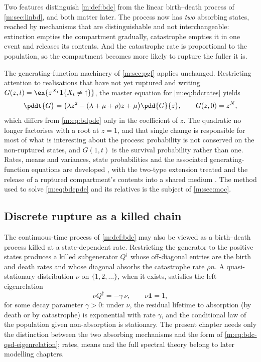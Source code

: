 Two features distinguish \cref{m:def:bdc} from the linear birth--death process of
\cref{m:sec:linbd}, and both matter later. The process now has \emph{two} absorbing
states, reached by mechanisms that are distinguishable and not interchangeable:
extinction empties the compartment gradually, catastrophe empties it in one event
and releases its contents. And the catastrophe rate is proportional to the
population, so the compartment becomes more likely to rupture the fuller it is.

The generating-function machinery of \cref{m:sec:pgf} applies unchanged. Restricting
attention to realisations that have not yet ruptured and writing
$G(z,t) = \ex{z^{X_t}\mathbf 1\{X_t\neq\dagger\}}$, the master equation for
\cref{m:eq:bdcrates} yields
\begin{equation}
\label{m:eq:bdcpde}
\pddt{G} = \bigl(\lambda z^2-(\lambda+\mu+\rho)z+\mu\bigr)\pdd{G}{z},
\qquad G(z,0) = z^{N},
\end{equation}
which differs from \cref{m:eq:bdpde} only in the coefficient of $z$. The quadratic no
longer factorises with a root at $z=1$, and that single change is responsible for
most of what is interesting about the process: probability is not conserved on the
non-ruptured states, and $G(1,t)$ is the survival probability rather than one.
Rates, means and variances, state probabilities and the associated
generating-function equations are developed , with the two-type extension treated
 and the release of a
ruptured compartment's contents into a shared medium
. The method used to solve
\cref{m:eq:bdcpde} and its relatives is the subject of \cref{m:sec:moc}.


\subsection{Discrete rupture as a killed chain}
\label{m:sec:killed-bdc}

The continuous-time process of \cref{m:def:bdc} may also be viewed as a birth--death
process killed at a state-dependent rate. Restricting the generator to the positive
states produces a killed subgenerator $Q^\dagger$ whose off-diagonal entries are the
birth and death rates and whose diagonal absorbs the catastrophe rate $\rho n$. A
quasi-stationary distribution $\nu$ on $\{1,2,\dots\}$, when it exists, satisfies
the left eigenrelation
\begin{equation}
\label{m:eq:bdc-qsd-eigenrelation}
\nu Q^\dagger = -\gamma\,\nu,
\qquad \nu\mathbf 1=1,
\end{equation}
for some decay parameter $\gamma>0$: under $\nu$, the residual lifetime to absorption
(by death or by catastrophe) is exponential with rate $\gamma$, and the conditional
law of the population given non-absorption is stationary. The present chapter needs
only the distinction between the two absorbing mechanisms and the form of
\cref{m:eq:bdc-qsd-eigenrelation}; rates, means and the full spectral theory belong
to later modelling chapters.

